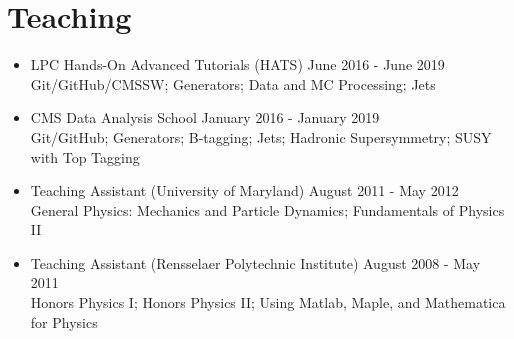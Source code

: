 \section{Teaching}
\begin{itemize}[leftmargin=12pt]
\item LPC Hands-On Advanced Tutorials (HATS) \hfill June 2016 - June 2019\\
Git/GitHub/CMSSW; Generators; Data and MC Processing; Jets
\item CMS Data Analysis School \hfill January 2016 - January 2019\\
Git/GitHub; Generators; B-tagging; Jets; Hadronic Supersymmetry; SUSY with Top Tagging
\item Teaching Assistant (University of Maryland) \hfill August 2011 - May 2012\\
General Physics: Mechanics and Particle Dynamics; Fundamentals of Physics II
\item Teaching Assistant (Rensselaer Polytechnic Institute) \hfill August 2008 - May 2011\\
Honors Physics I; Honors Physics II; Using Matlab, Maple, and Mathematica for Physics
\end{itemize}